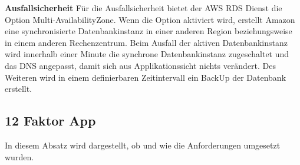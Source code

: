 \textbf{Ausfallsicherheit}
Für die Ausfallsicherheit bietet der AWS RDS Dienst die Option Multi-AvailabilityZone. Wenn die Option aktiviert wird, erstellt Amazon eine synchronisierte Datenbankinstanz in einer anderen Region beziehungsweise in einem anderen Rechenzentrum. Beim Ausfall der aktiven Datenbankinstanz wird innerhalb einer Minute die synchrone Datenbankinstanz zugeschaltet und das DNS angepasst, damit sich aus Applikationssicht nichts verändert.
Des Weiteren wird in einem definierbaren Zeitintervall ein BackUp der Datenbank erstellt.


\subsection{12 Faktor App}\label{12FactorApp}
In diesem Absatz wird dargestellt, ob und wie die Anforderungen umgesetzt wurden.


